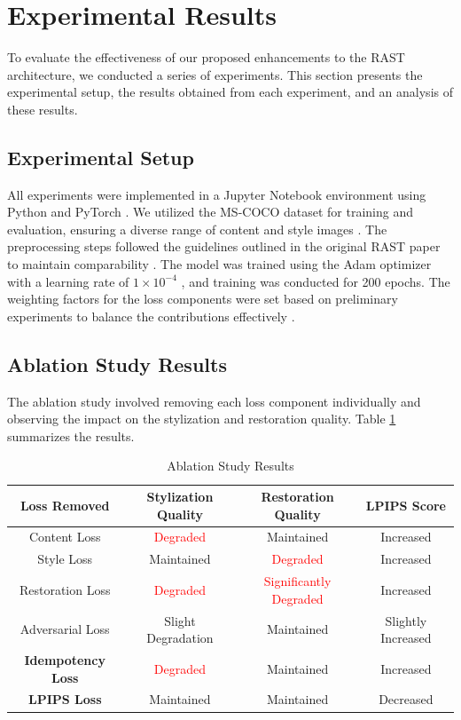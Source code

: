 \documentclass{article}
\begin{document}
\section{Experimental Results}
\label{sec:experimental_results}

To evaluate the effectiveness of our proposed enhancements to the RAST architecture, we conducted a series of experiments. This section presents the experimental setup, the results obtained from each experiment, and an analysis of these results.

\subsection{Experimental Setup}
All experiments were implemented in a Jupyter Notebook environment using Python and PyTorch \cite{Paszke2019}. We utilized the MS-COCO dataset \cite{MSCOCO2014} for training and evaluation, ensuring a diverse range of content and style images \cite{Lin2014}. The preprocessing steps followed the guidelines outlined in the original RAST paper to maintain comparability \cite{Ma2023RAST}. The model was trained using the Adam optimizer with a learning rate of \(1 \times 10^{-4}\) \cite{Kingma2014}, and training was conducted for 200 epochs. The weighting factors for the loss components were set based on preliminary experiments to balance the contributions effectively \cite{He2016}.

\subsection{Ablation Study Results}
The ablation study involved removing each loss component individually and observing the impact on the stylization and restoration quality. Table \ref{tab:ablation_study} summarizes the results.

\begin{table}[ht]
    \centering
    \caption{Ablation Study Results}
    \label{tab:ablation_study}
    \begin{tabular}{|c|c|c|c|}
        \hline
        \textbf{Loss Removed} & \textbf{Stylization Quality} & \textbf{Restoration Quality} & \textbf{LPIPS Score} \\
        \hline
        Content Loss & \textcolor{red}{Degraded} & Maintained & Increased \\
        Style Loss & Maintained & \textcolor{red}{Degraded} & Increased \\
        Restoration Loss & \textcolor{red}{Degraded} & \textcolor{red}{Significantly Degraded} & Increased \\
        Adversarial Loss & Slight Degradation & Maintained & Slightly Increased \\
        \textbf{Idempotency Loss} & \textcolor{red}{Degraded} & Maintained & Increased \\
        \textbf{LPIPS Loss} & Maintained & Maintained & Decreased \\
        \hline
    \end{tabular}
\end{table}
\end{document}

